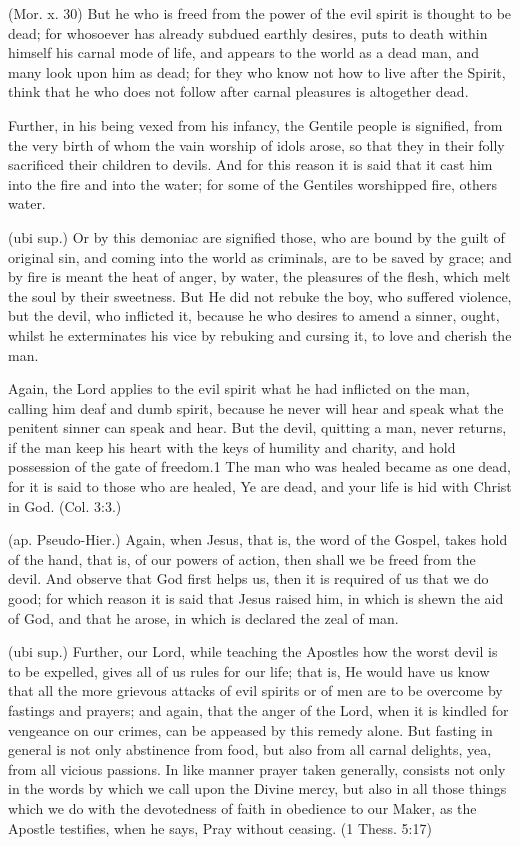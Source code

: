  (Mor. x. 30) But he who is freed from the power of the evil spirit is thought to be dead; for whosoever has already subdued earthly desires, puts to death within himself his carnal mode of life, and appears to the world as a dead man, and many look upon him as dead; for they who know not how to live after the Spirit, think that he who does not follow after carnal pleasures is altogether dead.

 Further, in his being vexed from his infancy, the Gentile people is signified, from the very birth of whom the vain worship of idols arose, so that they in their folly sacrificed their children to devils. And for this reason it is said that it cast him into the fire and into the water; for some of the Gentiles worshipped fire, others water.

 (ubi sup.) Or by this demoniac are signified those, who are bound by the guilt of original sin, and coming into the world as criminals, are to be saved by grace; and by fire is meant the heat of anger, by water, the pleasures of the flesh, which melt the soul by their sweetness. But He did not rebuke the boy, who suffered violence, but the devil, who inflicted it, because he who desires to amend a sinner, ought, whilst he exterminates his vice by rebuking and cursing it, to love and cherish the man.

 Again, the Lord applies to the evil spirit what he had inflicted on the man, calling him deaf and dumb spirit, because he never will hear and speak what the penitent sinner can speak and hear. But the devil, quitting a man, never returns, if the man keep his heart with the keys of humility and charity, and hold possession of the gate of freedom.1 The man who was healed became as one dead, for it is said to those who are healed, Ye are dead, and your life is hid with Christ in God. (Col. 3:3.)

 (ap. Pseudo-Hier.) Again, when Jesus, that is, the word of the Gospel, takes hold of the hand, that is, of our powers of action, then shall we be freed from the devil. And observe that God first helps us, then it is required of us that we do good; for which reason it is said that Jesus raised him, in which is shewn the aid of God, and that he arose, in which is declared the zeal of man.

 (ubi sup.) Further, our Lord, while teaching the Apostles how the worst devil is to be expelled, gives all of us rules for our life; that is, He would have us know that all the more grievous attacks of evil spirits or of men are to be overcome by fastings and prayers; and again, that the anger of the Lord, when it is kindled for vengeance on our crimes, can be appeased by this remedy alone. But fasting in general is not only abstinence from food, but also from all carnal delights, yea, from all vicious passions. In like manner prayer taken generally, consists not only in the words by which we call upon the Divine mercy, but also in all those things which we do with the devotedness of faith in obedience to our Maker, as the Apostle testifies, when he says, Pray without ceasing. (1 Thess. 5:17)

